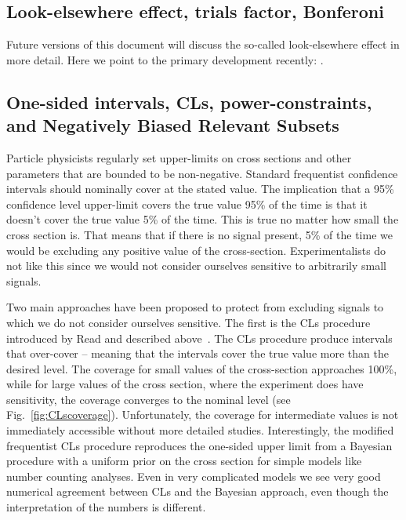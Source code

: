\subsection{Look-elsewhere effect, trials factor, Bonferoni}


Future versions of this document will discuss the so-called look-elsewhere effect in more detail.  Here we point to the primary development recently: \cite{LEE,ATL-PHYS-PUB-2011-011}.


\subsection{One-sided intervals, CLs, power-constraints, and Negatively Biased Relevant Subsets}


Particle physicists regularly set upper-limits on cross sections and other parameters that are bounded to be non-negative.  Standard frequentist confidence intervals should nominally cover at the stated value.  The implication that a 95\% confidence level upper-limit covers the true value 95\% of the time is that it doesn't cover the true value 5\% of the time.  This is true no matter how small the cross section is.  That means that if there is no signal present, 5\% of the time we would be excluding any positive value of the cross-section.  Experimentalists do not like this since we would not consider ourselves sensitive to arbitrarily small signals.  


Two main approaches have been proposed to protect from excluding signals to which we do not consider ourselves sensitive.  The first is the CLs procedure introduced by Read and described above~\cite{Read2,Read1,CLsWikipedia}.  The CLs procedure produce intervals that over-cover -- meaning that the intervals cover the true value more than the desired level.  The  coverage for small values of the cross-section approaches 100\%, while for large values of the cross section, where the experiment does have sensitivity, the coverage converges to the nominal level  (see Fig.~\ref{fig:CLscoverage}).  Unfortunately, the coverage for intermediate values is not immediately accessible without more detailed studies.  Interestingly, the modified frequentist CLs procedure reproduces the one-sided upper limit from a Bayesian procedure with a uniform prior on the cross section for simple models like number counting analyses.  Even in very complicated models we see very good numerical agreement between CLs and the Bayesian approach, even though the interpretation of the numbers is  different.


